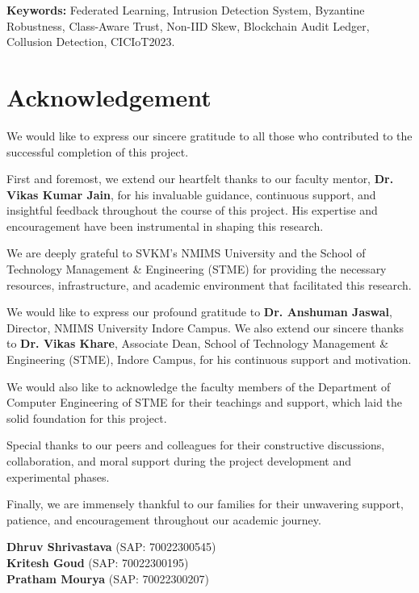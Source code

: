 \documentclass[12pt,a4paper]{report}
\begin{document}
\vspace{0.8cm}
\noindent \textbf{Keywords:} Federated Learning, Intrusion Detection System, Byzantine Robustness, Class-Aware Trust, Non-IID Skew, Blockchain Audit Ledger, Collusion Detection, CICIoT2023.

\newpage
\chapter*{Acknowledgement}

We would like to express our sincere gratitude to all those who contributed to the successful completion of this project.

First and foremost, we extend our heartfelt thanks to our faculty mentor, \textbf{Dr. Vikas Kumar Jain}, for his invaluable guidance, continuous support, and insightful feedback throughout the course of this project. His expertise and encouragement have been instrumental in shaping this research.

We are deeply grateful to SVKM's NMIMS University and the School of Technology Management \& Engineering (STME) for providing the necessary resources, infrastructure, and academic environment that facilitated this research.

We would like to express our profound gratitude to \textbf{Dr. Anshuman Jaswal}, Director, NMIMS University Indore Campus. We also extend our sincere thanks to \textbf{Dr. Vikas Khare}, Associate Dean, School of Technology Management \& Engineering (STME), Indore Campus, for his continuous support and motivation.

We would also like to acknowledge the faculty members of the Department of Computer Engineering of STME for their teachings and support, which laid the solid foundation for this project.

Special thanks to our peers and colleagues for their constructive discussions, collaboration, and moral support during the project development and experimental phases.

Finally, we are immensely thankful to our families for their unwavering support, patience, and encouragement throughout our academic journey.

\vspace{1.5cm}
\noindent
\begin{minipage}{0.48\textwidth}
\textbf{Dhruv Shrivastava} (SAP: 70022300545)\\[0.2cm]
\textbf{Kritesh Goud} (SAP: 70022300195)\\[0.2cm]
\textbf{Pratham Mourya} (SAP: 70022300207)
\end{minipage}
\end{document}
